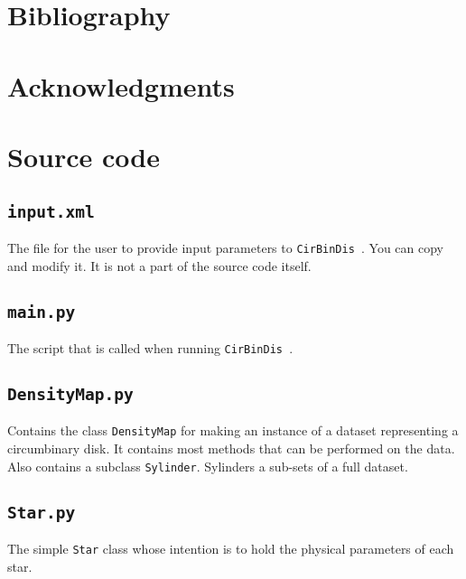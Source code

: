 \documentclass[a4paper, 12pt, english, titlepage]{article}
\newcommand{\sname}{\texttt{CirBinDis }}
\begin{document}
\section{Bibliography}


\section{Acknowledgments}


\section{Source code}

\subsection{\texttt{input.xml}}
    The file for the user to provide input parameters to \sname. You can copy and modify it. It is not a part of the source code itself.
    

\subsection{\texttt{main.py}}
    The script that is called when running \sname.
    

\subsection{\texttt{DensityMap.py}}
    Contains the class \texttt{DensityMap} for making an instance of a dataset representing a circumbinary disk. It contains most methods that can be performed on the data. Also contains a subclass \texttt{Sylinder}. Sylinders a sub-sets of a full dataset.
    

\subsection{\texttt{Star.py}}
    The simple \texttt{Star} class whose intention is to hold the physical parameters of each star.
    
\end{document}
